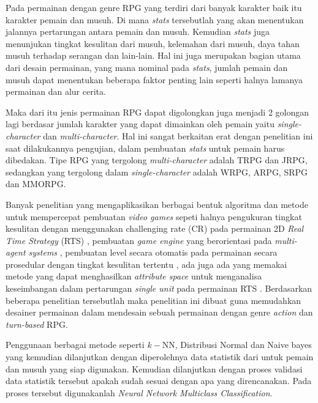 Pada permainan dengan genre RPG yang terdiri dari banyak karakter baik itu karakter pemain dan musuh. Di mana \textit{stats} tersebutlah yang akan menentukan jalannya pertarungan antara pemain dan musuh. Kemudian \textit{stats} juga menunjukan tingkat kesulitan dari musuh, kelemahan dari musuh, daya tahan musuh terhadap serangan dan lain-lain. Hal ini juga merupakan bagian utama dari desain permainan, yang mana nominal pada \textit{stats}, jumlah pemain dan musuh dapat menentukan beberapa faktor penting lain seperti halnya lamanya permainan dan alur cerita. 
\vspace{1ex}

Maka dari itu jenis permainan RPG dapat digolongkan juga menjadi 2 golongan lagi berdasar jumlah karakter yang dapat dimainkan oleh pemain yaitu \textit{single-character} dan \textit{multi-character}. Hal ini sangat berkaitan erat dengan penelitian ini saat dilakukannya pengujian, dalam pembuatan \textit{stats} untuk pemain harus dibedakan. Tipe RPG yang tergolong \textit{multi-character} adalah TRPG dan JRPG, sedangkan yang tergolong dalam \textit{single-character} adalah WRPG, ARPG, SRPG dan MMORPG.
\vspace{1ex}

Banyak penelitian yang mengaplikasikan berbagai bentuk algoritma dan metode untuk mempercepat pembuatan \textit{video games} sepeti halnya pengukuran tingkat kesulitan dengan menggunakan challenging rate (CR) pada permainan 2D \textit{Real Time Strategy} (RTS) \citep{Christyowidiasmoro2016}, pembuatan \textit{game engine} yang berorientasi pada \textit{multi-agent systems} \citep{Marin-Lora2020}, pembuatan level secara otomatis pada permainan secara prosedular dengan tingkat kesulitan tertentu \citep{Wu2018}, ada juga ada yang memakai metode yang dapat menghasilkan \textit{attribute space} untuk menganalisa keseimbangan dalam pertarungan \textit{single unit} pada permainan RTS \citep{Bangay2014}. Berdasarkan beberapa penelitian tersebutlah maka penelitian ini dibuat guna memudahkan desainer permainan dalam mendesain sebuah permainan dengan genre \textit{action} dan \textit{turn-based} RPG.
\vspace{1ex}

Penggunaan berbagai metode seperti $k-$NN, Distribusi Normal dan Naive bayes yang kemudian dilanjutkan dengan diperolehnya data statistik dari untuk pemain dan musuh yang siap digunakan. Kemudian dilanjutkan dengan proses validasi data statistik tersebut apakah sudah sesuai dengan apa yang direncanakan. Pada proses tersebut digunakanlah \textit{Neural Network Multiclass Classification}.
\vspace{1ex}

